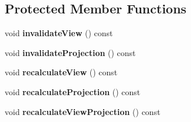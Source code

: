 \subsection*{Protected Member Functions}
\begin{DoxyCompactItemize}
\item 
\hypertarget{class_camera_ada8eafa78187469b93a22e2cc97d49f8}{}void {\bfseries invalidate\+View} () const \label{class_camera_ada8eafa78187469b93a22e2cc97d49f8}

\item 
\hypertarget{class_camera_a8067b4207b1a429318159059fac186c0}{}void {\bfseries invalidate\+Projection} () const \label{class_camera_a8067b4207b1a429318159059fac186c0}

\item 
\hypertarget{class_camera_aa1ce6744a19131677ee890325032e749}{}void {\bfseries recalculate\+View} () const \label{class_camera_aa1ce6744a19131677ee890325032e749}

\item 
\hypertarget{class_camera_adba918d86364f5452cad93a9ec6ea6d6}{}void {\bfseries recalculate\+Projection} () const \label{class_camera_adba918d86364f5452cad93a9ec6ea6d6}

\item 
\hypertarget{class_camera_ae4c6dcfee420eb57f9521d5195ce78f8}{}void {\bfseries recalculate\+View\+Projection} () const \label{class_camera_ae4c6dcfee420eb57f9521d5195ce78f8}

\end{DoxyCompactItemize}
